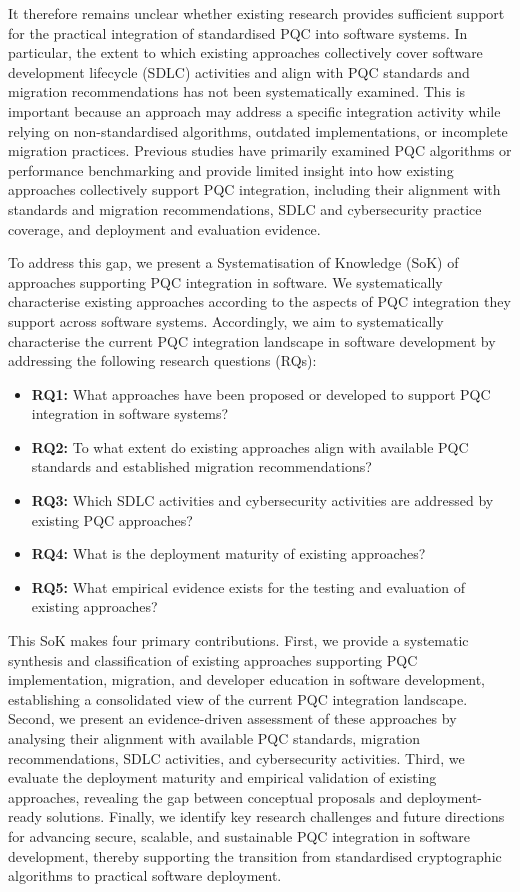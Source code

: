 \documentclass[letterpaper,twocolumn,10pt]{article}
\begin{document}
It therefore remains unclear whether existing research provides sufficient support for the practical integration of standardised PQC into software systems. In particular, the extent to which existing approaches collectively cover software development lifecycle (SDLC) activities and align with PQC standards and migration recommendations has not been systematically examined. This is important because an approach may address a specific integration activity while relying on non-standardised algorithms, outdated implementations, or incomplete migration practices. Previous studies \cite{NISTTheoryReview, cryptography10010011, cryptography9020032, BenchAlgo} have primarily examined PQC algorithms or performance benchmarking and provide limited insight into how existing approaches collectively support PQC integration, including their alignment with standards and migration recommendations, SDLC and cybersecurity practice coverage, and deployment and evaluation evidence.

To address this gap, we present a Systematisation of Knowledge (SoK) of approaches supporting PQC integration in software. We systematically characterise existing approaches according to the aspects of PQC integration they support across software systems. Accordingly, we aim to systematically characterise the current PQC integration landscape in software development by addressing the following research questions (RQs):

\begin{itemize}
\item \textbf{RQ1:} What approaches have been proposed or developed to support PQC integration in software systems?
\item \textbf{RQ2:} To what extent do existing approaches align with available PQC standards and established migration recommendations?
\item \textbf{RQ3:} Which SDLC activities and cybersecurity activities are addressed by existing PQC approaches?
\item \textbf{RQ4:} What is the deployment maturity of existing approaches?
\item \textbf{RQ5:} What empirical evidence exists for the testing and evaluation of existing approaches? 
\end{itemize}

This SoK makes four primary contributions. First, we provide a systematic synthesis and classification of existing approaches supporting PQC implementation, migration, and developer education in software development, establishing a consolidated view of the current PQC integration landscape. Second, we present an evidence-driven assessment of these approaches by analysing their alignment with available PQC standards, migration recommendations, SDLC activities, and cybersecurity activities. Third, we evaluate the deployment maturity and empirical validation of existing approaches, revealing the gap between conceptual proposals and deployment-ready solutions. Finally, we identify key research challenges and future directions for advancing secure, scalable, and sustainable PQC integration in software development, thereby supporting the transition from standardised cryptographic algorithms to practical software deployment.
\end{document}
